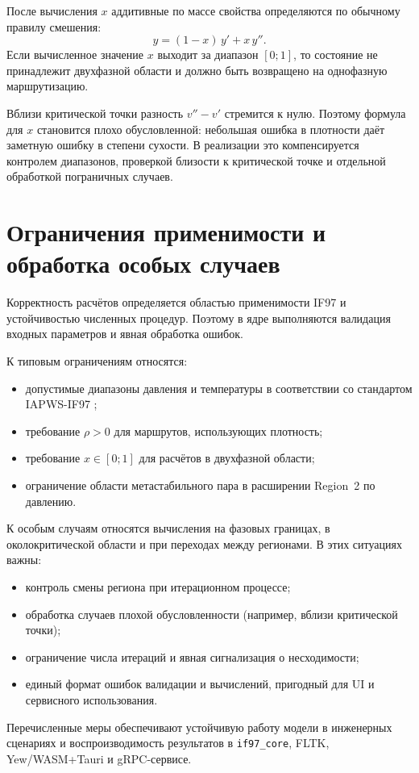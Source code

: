 После вычисления $x$
аддитивные по массе свойства
определяются по обычному правилу смешения:
\begin{equation}
y = (1-x)\,y' + x\,y''.
\end{equation}
Если вычисленное значение $x$
выходит за диапазон $[0; 1]$,
то состояние не принадлежит двухфазной области
и должно быть возвращено на однофазную маршрутизацию.

Вблизи критической точки
разность $v''-v'$ стремится к нулю.
Поэтому формула для $x$
становится плохо обусловленной:
небольшая ошибка в плотности
даёт заметную ошибку в степени сухости.
В реализации это компенсируется
контролем диапазонов,
проверкой близости к критической точке
и отдельной обработкой пограничных случаев.

\section{Ограничения применимости и обработка особых случаев}

Корректность расчётов определяется
областью применимости IF97 и устойчивостью численных процедур.
Поэтому в ядре выполняются
валидация входных параметров и явная обработка ошибок.

К типовым ограничениям относятся:
\begin{itemize}
\item допустимые диапазоны давления и температуры в соответствии со стандартом IAPWS-IF97 \cite{iapws_if97_2012};
\item требование $\rho > 0$ для маршрутов, использующих плотность;
\item требование $x \in [0;1]$ для расчётов в двухфазной области;
\item ограничение области метастабильного пара в расширении Region~2 по давлению.
\end{itemize}

К особым случаям относятся вычисления на фазовых границах, в околокритической области и при переходах между регионами.
В этих ситуациях важны:
\begin{itemize}
\item контроль смены региона при итерационном процессе;
\item обработка случаев плохой обусловленности (например, вблизи критической точки);
\item ограничение числа итераций и явная сигнализация о несходимости;
\item единый формат ошибок валидации и вычислений, пригодный для UI и сервисного использования.
\end{itemize}

Перечисленные меры обеспечивают
устойчивую работу модели в инженерных сценариях
и воспроизводимость результатов в \texttt{if97\_core},
FLTK, Yew/WASM+Tauri и gRPC-сервисе.
